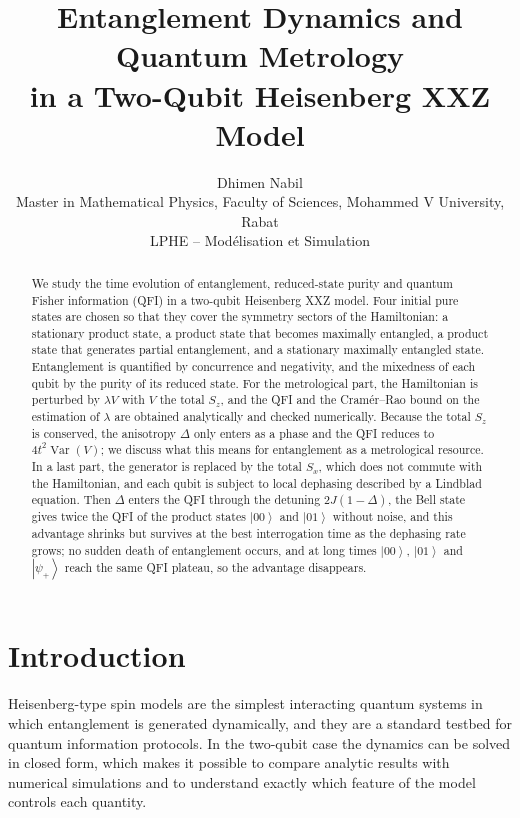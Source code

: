 \documentclass[11pt,a4paper]{article}
\title{Entanglement Dynamics and Quantum Metrology\\in a Two-Qubit Heisenberg XXZ Model}
\author{Dhimen Nabil\\[2pt]
\small Master in Mathematical Physics, Faculty of Sciences, Mohammed V University, Rabat\\
\small LPHE -- Mod\'elisation et Simulation}
\date{}
\newcommand{\ket}[1]{\left|#1\right\rangle}
\newcommand{\Var}{\operatorname{Var}}
\begin{document}
\maketitle

\begin{abstract}
We study the time evolution of entanglement, reduced-state purity and quantum Fisher information (QFI) in a two-qubit Heisenberg XXZ model. Four initial pure states are chosen so that they cover the symmetry sectors of the Hamiltonian: a stationary product state, a product state that becomes maximally entangled, a product state that generates partial entanglement, and a stationary maximally entangled state. Entanglement is quantified by concurrence and negativity, and the mixedness of each qubit by the purity of its reduced state. For the metrological part, the Hamiltonian is perturbed by $\lambda V$ with $V$ the total $S_z$, and the QFI and the Cram\'er--Rao bound on the estimation of $\lambda$ are obtained analytically and checked numerically. Because the total $S_z$ is conserved, the anisotropy $\Delta$ only enters as a phase and the QFI reduces to $4t^2\Var(V)$; we discuss what this means for entanglement as a metrological resource. In a last part, the generator is replaced by the total $S_x$, which does not commute with the Hamiltonian, and each qubit is subject to local dephasing described by a Lindblad equation. Then $\Delta$ enters the QFI through the detuning $2J(1-\Delta)$, the Bell state gives twice the QFI of the product states $\ket{00}$ and $\ket{01}$ without noise, and this advantage shrinks but survives at the best interrogation time as the dephasing rate grows; no sudden death of entanglement occurs, and at long times $\ket{00}$, $\ket{01}$ and $\ket{\psi_+}$ reach the same QFI plateau, so the advantage disappears.
\end{abstract}

\tableofcontents
\newpage

\section{Introduction}

Heisenberg-type spin models are the simplest interacting quantum systems in which entanglement is generated dynamically, and they are a standard testbed for quantum information protocols. In the two-qubit case the dynamics can be solved in closed form, which makes it possible to compare analytic results with numerical simulations and to understand exactly which feature of the model controls each quantity.
\end{document}
